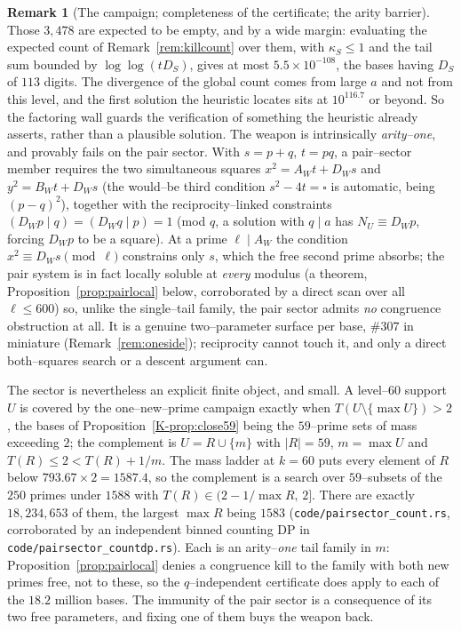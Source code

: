 \documentclass[11pt]{article}
\theoremstyle{definition}
\newtheorem{remark}[theorem]{Remark}
\begin{document}
\begin{remark}[The campaign; completeness of the certificate; the arity barrier]
Those $3{,}478$ are expected to be empty, and by a wide margin: evaluating the expected count of
Remark~\ref{rem:killcount} over them, with $\kappa_S\le1$ and the tail sum bounded by
$\log\log(tD_S)$, gives at most $5.5\times10^{-108}$, the bases having $D_S$ of $113$ digits. The
divergence of the global count comes from large $a$ and not from this level, and the first solution
the heuristic locates sits at $10^{116.7}$ or beyond. So the factoring wall guards the verification of
something the heuristic already asserts, rather than a plausible solution. The weapon is intrinsically \emph{arity--one}, and provably fails on the pair sector. With
$s=p+q$, $t=pq$, a pair--sector member requires the two simultaneous squares $x^2=A_Wt+D_Ws$ and
$y^2=B_Wt+D_Ws$ (the would--be third condition $s^2-4t=\square$ is automatic, being $(p-q)^2$),
together with the reciprocity--linked constraints $(D_Wp\mid q)=(D_Wq\mid p)=1$ (mod $q$, a
solution with $q\mid a$ has $N_U\equiv D_Wp$, forcing $D_Wp$ to be a square). At a prime
$\ell\mid A_W$ the condition $x^2\equiv D_Ws\pmod\ell$ constrains only $s$, which the free second
prime absorbs; the pair system is in fact locally soluble at \emph{every} modulus (a theorem,
Proposition~\ref{prop:pairlocal} below, corroborated by a direct scan over all $\ell\le600$) so,
unlike the single--tail family, the pair sector admits \emph{no} congruence obstruction at all. It
is a genuine two--parameter surface per base, $\#307$ in miniature (Remark~\ref{rem:oneside});
reciprocity cannot touch it, and only a direct both--squares search or a descent argument can.

The sector is nevertheless an explicit finite object, and small. A level--$60$ support $U$ is covered
by the one--new--prime campaign exactly when $T(U\setminus\{\max U\})>2$, the bases of
Proposition~\ref{K-prop:close59} being the $59$--prime sets of mass exceeding $2$; the complement is
$U=R\cup\{m\}$ with $|R|=59$, $m=\max U$ and $T(R)\le2<T(R)+1/m$. The mass ladder at $k=60$ puts
every element of $R$ below $793.67\times2=1587.4$, so the complement is a search over $59$--subsets
of the $250$ primes under $1588$ with $T(R)\in(2-1/\max R,\,2]$. There are exactly
$18{,}234{,}653$ of them, the largest $\max R$ being $1583$ \textup{(\texttt{code/pairsector\_count.rs},
corroborated by an independent binned counting DP in \texttt{code/pairsector\_countdp.rs})}. Each is
an arity--\emph{one} tail family in $m$: Proposition~\ref{prop:pairlocal} denies a congruence kill to
the family with both new primes free, not to these, so the $q$--independent certificate does apply to
each of the $18.2$ million bases. The immunity of the pair sector is a consequence of its two free
parameters, and fixing one of them buys the weapon back.


\end{remark}
\end{document}
